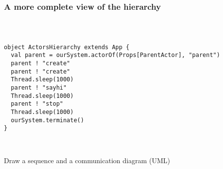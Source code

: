 \documentclass[aspectratio=169]{beamer}
\begin{document}
\begin{frame}[fragile]\frametitle{A more complete view of the hierarchy}
~\\[-6mm]
\begin{columns}
\begin{column}{0.57\textwidth}
\begin{lstlisting}[emph={Actor, Logging, Props, ourSystem,terminate,sleep,actorOf,receive}]
object ActorsHierarchy extends App {
  val parent = ourSystem.actorOf(Props[ParentActor], "parent")
  parent ! "create"
  parent ! "create"
  Thread.sleep(1000)
  parent ! "sayhi"
  Thread.sleep(1000)
  parent ! "stop"
  Thread.sleep(1000)
  ourSystem.terminate()
}\end{lstlisting}
~\\[-10mm]
\begin{exampleblock}{}
Draw a sequence and a communication diagram (UML)
\end{exampleblock}
\end{column}
\begin{column}{0.41\textwidth}
  ~\\
\end{column}
\end{columns}
\end{frame}
\end{document}
